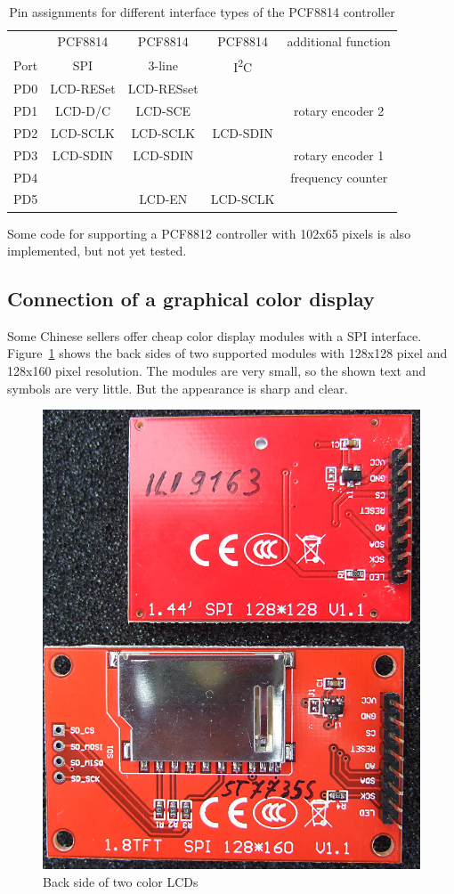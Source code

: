 \begin{table}[H]
  \begin{center}
    \begin{tabular}{| c || c | c | c | c |}
    \hline
           &  PCF8814    & PCF8814        & PCF8814     & additional function \\
      Port &    SPI      & 3-line         &   I\textsuperscript{2}C      & \\
    \hline
    \hline
    PD0    &   LCD-RESet  & LCD-RESset       &            & \\
    \hline
    PD1    &   LCD-D/C   & LCD-SCE        &             & rotary encoder 2 \\
    \hline
    PD2    &   LCD-SCLK  & LCD-SCLK       &  LCD-SDIN   & \\
    \hline
    PD3    &   LCD-SDIN  & LCD-SDIN       &             & rotary encoder 1 \\
    \hline
    PD4    &             &                &             & frequency counter \\
    \hline
    PD5    &             & LCD-EN         &   LCD-SCLK  & \\
    \hline
    \end{tabular}
  \end{center}
  \caption{Pin assignments for different interface types of the PCF8814 controller}
  \label{tab:PCF8814-con}
\end{table}

Some code for supporting a PCF8812 controller with 102x65 pixels is also implemented,
but not yet tested.

\subsection{Connection of a graphical color display}

Some Chinese sellers offer cheap color display modules with a SPI interface.
Figure~\ref{fig:Color_both} shows the back sides of two supported modules with 128x128 pixel
and 128x160 pixel resolution.
The modules are very small, so the shown text and symbols are very little.
But the appearance is sharp and clear.

\begin{figure}[H]
\centering
\includegraphics[width=.46\textwidth]{../PNG/Color_ILI9163_ST7735.jpg}
\caption{Back side of two color LCDs}
\label{fig:Color_both}
\end{figure}

